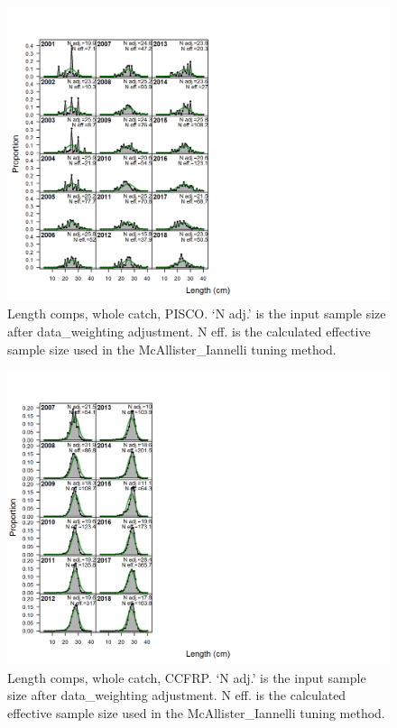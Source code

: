 \documentclass[12pt,]{article}
\begin{document}
\begin{figure}
\centering
\includegraphics{./r4ss/plots_mod1/comp_lenfit_flt6mkt0.png}
\caption{Length comps, whole catch, PISCO. `N adj.' is the input sample
size after data\_weighting adjustment. N eff. is the calculated
effective sample size used in the McAllister\_Iannelli tuning method.
\label{fig:mod1_5_comp_lenfit_flt6mkt0}}
\end{figure}

\begin{figure}
\centering
\includegraphics{./r4ss/plots_mod1/comp_lenfit_flt7mkt0.png}
\caption{Length comps, whole catch, CCFRP. `N adj.' is the input sample
size after data\_weighting adjustment. N eff. is the calculated
effective sample size used in the McAllister\_Iannelli tuning method.
\label{fig:mod1_6_comp_lenfit_flt7mkt0}}
\end{figure}
\end{document}
